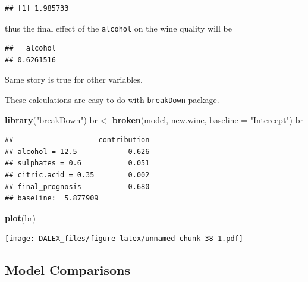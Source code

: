 \documentclass[]{book}
\newenvironment{Shaded}{\begin{snugshade}}{\end{snugshade}}
\newcommand{\KeywordTok}[1]{\textcolor[rgb]{0.13,0.29,0.53}{\textbf{#1}}}
\newcommand{\DataTypeTok}[1]{\textcolor[rgb]{0.13,0.29,0.53}{#1}}
\newcommand{\StringTok}[1]{\textcolor[rgb]{0.31,0.60,0.02}{#1}}
\newcommand{\OperatorTok}[1]{\textcolor[rgb]{0.81,0.36,0.00}{\textbf{#1}}}
\newcommand{\NormalTok}[1]{#1}
\theoremstyle{definition}
\theoremstyle{definition}
\theoremstyle{definition}
\theoremstyle{remark}
\begin{document}
\begin{verbatim}
## [1] 1.985733
\end{verbatim}

thus the final effect of the \texttt{alcohol} on the wine quality will
be

\begin{Shaded}
\end{Shaded}

\begin{verbatim}
##   alcohol 
## 0.6261516
\end{verbatim}

Same story is true for other variables.

These calculations are easy to do with \texttt{breakDown} package.

\begin{Shaded}
\begin{Highlighting}[]
\KeywordTok{library}\NormalTok{(}\StringTok{"breakDown"}\NormalTok{)}
\NormalTok{br <-}\StringTok{ }\KeywordTok{broken}\NormalTok{(model, new.wine, }\DataTypeTok{baseline =} \StringTok{"Intercept"}\NormalTok{)}
\NormalTok{br}
\end{Highlighting}
\end{Shaded}

\begin{verbatim}
##                    contribution
## alcohol = 12.5            0.626
## sulphates = 0.6           0.051
## citric.acid = 0.35        0.002
## final_prognosis           0.680
## baseline:  5.877909
\end{verbatim}

\begin{Shaded}
\begin{Highlighting}[]
\KeywordTok{plot}\NormalTok{(br)}
\end{Highlighting}
\end{Shaded}

\texttt{[image: DALEX\_files/figure-latex/unnamed-chunk-38-1.pdf]}

\subsection{Model Comparisons}\label{model-comparisons-1}
\end{document}
